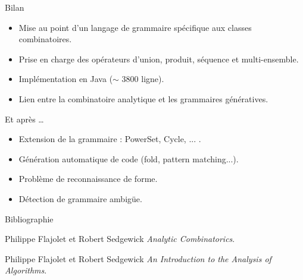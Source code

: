 \documentclass{beamer}
\begin{document}
\begin{frame}{Bilan}
\begin{itemize}
\item Mise au point d'un langage de grammaire spécifique aux classes combinatoires.
\item Prise en charge des opérateurs d'union, produit, séquence et multi-ensemble.
\item Implémentation en Java ($\sim$ 3800 ligne). \\
  \footnotesize{}
\normalsize
\item Lien entre la combinatoire analytique et les grammaires génératives.
\end{itemize}
\end{frame}



\begin{frame}{Et après \ldots}
\begin{itemize}
\item Extension de la grammaire : PowerSet, Cycle, ... .
\item Génération automatique de code (fold, pattern matching...).
\item Problème de reconnaissance de forme.
\item Détection de grammaire ambigüe.
\end{itemize}
\end{frame}
\begin{frame}{Bibliographie}
  
  \begin{thebibliography}{9}
    Philippe Flajolet et Robert Sedgewick
    \emph{ Analytic Combinatorics}.

    Philippe Flajolet et Robert Sedgewick
    \emph{An Introduction to the Analysis of Algorithms}.

  \end{thebibliography}

\end{frame}
\end{document}
